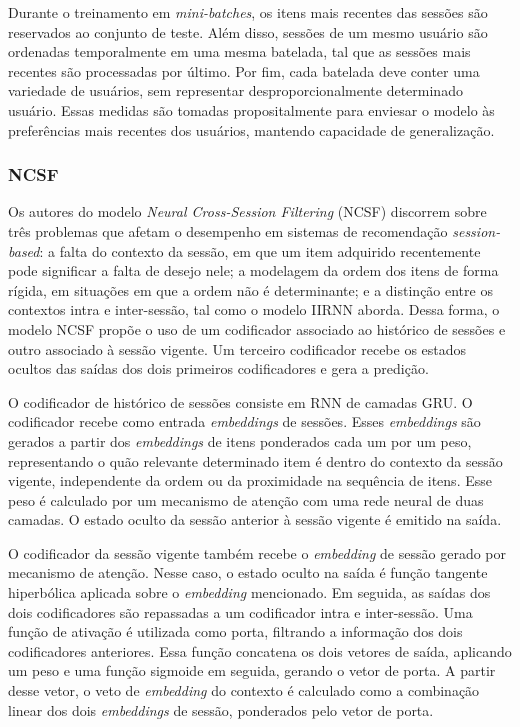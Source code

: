 Durante o treinamento em \textit{mini-batches}, os itens mais recentes das
sessões são reservados ao conjunto de teste. Além disso, sessões de um mesmo
usuário são ordenadas temporalmente em uma mesma batelada, tal que as
sessões mais recentes são processadas por último. Por fim, cada batelada
deve conter uma variedade de usuários, sem representar desproporcionalmente
determinado usuário. Essas medidas são tomadas propositalmente para enviesar o
modelo às preferências mais recentes dos usuários, mantendo capacidade de
generalização. 

\subsubsection{NCSF}
Os autores do modelo \textit{Neural Cross-Session Filtering} (NCSF) discorrem
sobre três problemas que afetam o desempenho em sistemas de recomendação
\textit{session-based}: a falta do contexto da sessão, em que um item adquirido
recentemente pode significar a falta de desejo nele; a modelagem da ordem dos
itens de forma rígida, em situações em que a ordem não é determinante; e a
distinção entre os contextos intra e inter-sessão, tal como o modelo IIRNN aborda.
Dessa forma, o modelo NCSF propõe o uso de um codificador associado ao histórico de sessões
e outro associado à sessão vigente. Um terceiro codificador recebe os estados ocultos das saídas
dos dois primeiros codificadores e gera a predição.

O codificador de histórico de sessões consiste em RNN de camadas GRU. O
codificador recebe como entrada \textit{embeddings} de sessões. Esses
\textit{embeddings} são gerados a partir dos \textit{embeddings} de itens
ponderados cada um por um peso, representando o quão relevante determinado item
é dentro do contexto da sessão vigente, independente da ordem ou da proximidade
na sequência de itens. Esse peso é calculado por um mecanismo de atenção com uma
rede neural de duas camadas. O estado oculto da sessão anterior à sessão vigente
é emitido na saída.

O codificador da sessão vigente também recebe o \textit{embedding} de sessão
gerado por mecanismo de atenção. Nesse caso, o estado oculto na saída é função
tangente hiperbólica aplicada sobre o \textit{embedding} mencionado. Em seguida,
as saídas dos dois codificadores são repassadas a um codificador intra e
inter-sessão. Uma função de ativação é utilizada como porta, filtrando a
informação dos dois codificadores anteriores. Essa função concatena os dois
vetores de saída, aplicando um peso e uma função sigmoide em seguida, gerando o
vetor de porta. A partir desse vetor, o veto de \textit{embedding} do contexto
é calculado como a combinação linear dos dois \textit{embeddings} de sessão,
ponderados pelo vetor de porta.

